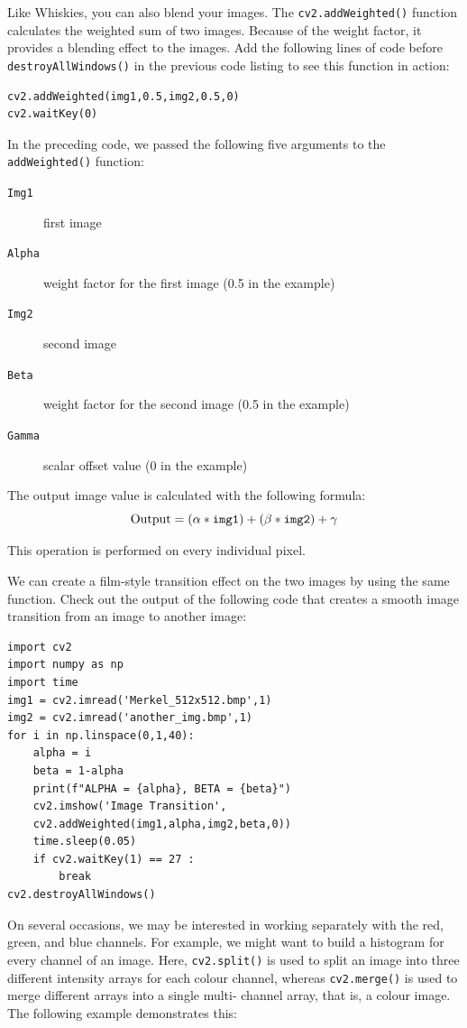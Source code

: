 \documentclass{labo}
\begin{document}
Like Whiskies, you can also blend your images. The \texttt{cv2.addWeighted()} function calculates the weighted sum of two images. Because of the weight factor, it provides a blending effect to the images. Add the following lines of code before \texttt{destroyAllWindows()} in the previous code listing to see this function in action:

\begin{verbatim}
cv2.addWeighted(img1,0.5,img2,0.5,0)
cv2.waitKey(0)
\end{verbatim}
In the preceding code, we passed the following five arguments to the \texttt{addWeighted()} function:
\begin{description}
	\item[\texttt{Img1}] first image
	\item[\texttt{Alpha}]  weight factor for the first image (0.5 in the example)
	\item[\texttt{Img2}]  second image
	\item[\texttt{Beta}] weight factor for the second image (0.5 in the example)
	\item[\texttt{Gamma}]  scalar offset value (0 in the example)
\end{description}

The output image value is calculated with the following formula:
\[\text{Output}=(\alpha*\text{\texttt{img1}})+(\beta*\text{\texttt{img2}})+\gamma\]

This operation is performed on every individual pixel.

We can create a film-style transition effect on the two images by using the same function. Check out the output of the following code that creates a smooth image transition from an image to another image:

\begin{verbatim}
import cv2
import numpy as np
import time
img1 = cv2.imread('Merkel_512x512.bmp',1)
img2 = cv2.imread('another_img.bmp',1)
for i in np.linspace(0,1,40):
	alpha = i
	beta = 1-alpha
	print(f"ALPHA = {alpha}, BETA = {beta}")
	cv2.imshow('Image Transition',
	cv2.addWeighted(img1,alpha,img2,beta,0))
	time.sleep(0.05)
	if cv2.waitKey(1) == 27 :
		break
cv2.destroyAllWindows()
\end{verbatim}

On several occasions, we may be interested in working separately with the red, green, and blue channels. For example, we might want to build a histogram for every channel of an image. Here, \texttt{cv2.split()} is used to split an image into three different intensity arrays for each colour channel, whereas \texttt{cv2.merge()} is used to merge different arrays into a single multi- channel array, that is, a colour image. The following example demonstrates this:
\end{document}
